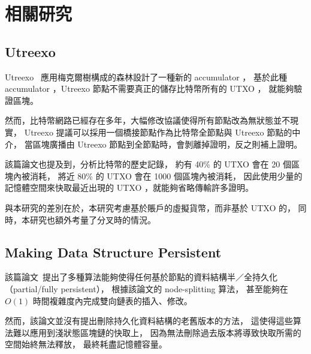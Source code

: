 \chapter{相關研究}
\label{c:related}

\section{Utreexo}
Utreexo~\cite{dryja2019utreexo} 應用梅克爾樹構成的森林設計了一種新的 accumulator ，
基於此種 accumulator ，Utreexo 節點不需要真正的儲存比特幣所有的 UTXO ，
就能夠驗證區塊。

然而，比特幣網路已經存在多年，大幅修改協議使得所有節點改為無狀態並不現實，
Utreexo 提議可以採用一個橋接節點作為比特幣全節點與 Utreexo 節點的中介，
當區塊廣播由 Utreexo 節點到全節點時，會剝離掉證明，反之則補上證明。

該篇論文也提及到，分析比特幣的歷史記錄，
約有 40\% 的 UTXO 會在 20 個區塊內被消耗，
將近 80\% 的 UTXO 會在 1000 個區塊內被消耗，
因此使用少量的記憶體空間來快取最近出現的 UTXO ，就能夠省略傳輸許多證明。

與本研究的差別在於，本研究考慮基於賬戶的虛擬貨幣，而非基於 UTXO 的，
同時，本研究也額外考量了分叉時的情況。

\section{Making Data Structure Persistent}
該篇論文~\cite{driscoll1986making}提出了多種算法能夠使得任何基於節點的資料結構半／全持久化（partial/fully persistent），
根據該論文的 node-splitting 算法，
甚至能夠在 $O(1)$ 時間複雜度內完成雙向鏈表的插入、修改。

然而，該論文並沒有提出刪除持久化資料結構的老舊版本的方法，
這使得這些算法難以應用到淺狀態區塊鏈的快取上，
因為無法刪除過去版本將導致快取所需的空間始終無法釋放，
最終耗盡記憶體容量。
